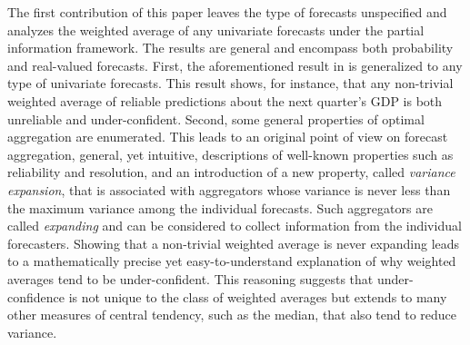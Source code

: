 \documentclass[12pt]{article}
\theoremstyle{definition}
\theoremstyle{definition}
\begin{document}
The first contribution of this paper
leaves the type of forecasts unspecified and analyzes the weighted average of any univariate forecasts under the partial information framework. The results are general and encompass both probability and real-valued forecasts. First,  the aforementioned result
in \cite{Ranjan08} is generalized to any type of univariate
forecasts.
This result shows, for instance, that any non-trivial
weighted average of reliable predictions about the next quarter's GDP
is both unreliable and under-confident. 
Second, some general properties of optimal aggregation are enumerated. This  leads to
an original point of view on forecast aggregation, general, yet intuitive, descriptions of well-known properties
such as reliability and resolution, and an introduction of a new property, called \textit{variance expansion}, that is associated with aggregators whose variance is
never less than the maximum variance among the individual
forecasts. Such aggregators are called \textit{expanding} and can be considered to collect information from the individual forecasters. Showing that a non-trivial weighted average is never expanding leads to a mathematically precise yet
easy-to-understand explanation of why weighted averages tend to be
under-confident. This reasoning suggests that
under-confidence is not unique to the class of weighted averages but
extends to many other measures of central tendency, such as the
median, that also tend to reduce variance.
\end{document}
